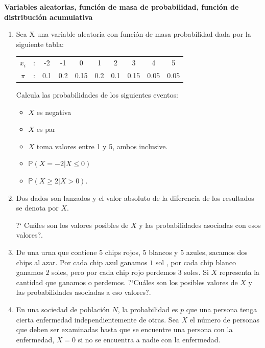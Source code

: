 \documentclass[a4paper,10pt]{report}
\begin{document}
\textbf{Variables aleatorias, funci\'on de masa de probabilidad, funci\'on de distribuci\'on acumulativa}

\vspace{0.3cm}

\begin{enumerate}
\item Sea X una variable aleatoria con funci\'on de masa probabilidad dada por la siguiente tabla:
\begin{center}
	\begin{tabular}{cccccccccc}
		$x_i$  &:& -2& -1& 0 &1& 2& 3& 4& 5\\
		$\pi$ &:& 0.1& 0.2& 0.15& 0.2& 0.1& 0.15& 0.05& 0.05
	\end{tabular}
\end{center}
Calcula las probabilidades de los siguientes eventos:
\begin{itemize}
	\item $X$ es negativa
	\item $X$ es par
	\item $X$ toma valores entre 1 y 5, ambos inclusive.
	\item $\mathbb{P}(X = -2|X \leq 0)$
	\item $\mathbb{P}(X \geq 2|X > 0)$.
\end{itemize}
\item Dos dados  son lanzados y el valor absoluto de la diferencia de los resultados se denota por $X$.

?` Cu\'ales son los valores posibles de $X$ y las probabilidades asociadas con esos valores?.

\item De una urna que contiene $5$ chips rojos, $5$ blancos y $5$  azules,  sacamos dos chips al azar. Por cada chip azul ganamos $1$ sol , por cada chip blanco ganamos $2$ soles, pero por cada chip rojo perdemos  $3$ soles. Si $X$ representa la cantidad que ganamos o perdemos. ?`Cu\'ales son los posibles valores de $X$ y las probabilidades asociadas a eso valores?.

\item En una sociedad de poblaci\'on $N$, la probabilidad es  $p$  que una persona tenga cierta enfermedad  independientemente de otras. Sea $X$ el n\'umero de personas que deben ser examinadas hasta que se encuentre una persona con la enfermedad, $X = 0$ si no se encuentra a nadie con la enfermedad. 


\end{enumerate}
\end{document}
